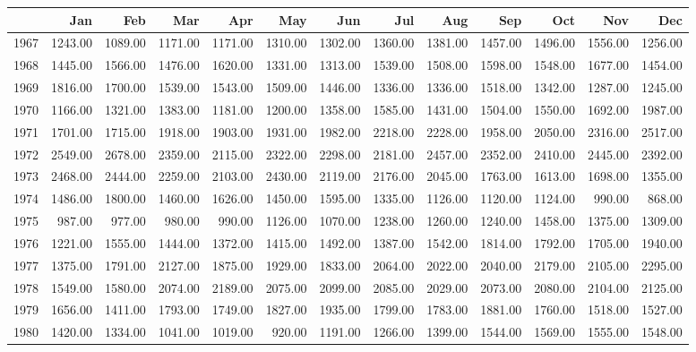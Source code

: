 \begin{longtable}{rrrrrrrrrrrrr}
  \hline
 & Jan & Feb & Mar & Apr & May & Jun & Jul & Aug & Sep & Oct & Nov & Dec \\ 
  \hline
1967 & 1243.00 & 1089.00 & 1171.00 & 1171.00 & 1310.00 & 1302.00 & 1360.00 & 1381.00 & 1457.00 & 1496.00 & 1556.00 & 1256.00 \\ 
  1968 & 1445.00 & 1566.00 & 1476.00 & 1620.00 & 1331.00 & 1313.00 & 1539.00 & 1508.00 & 1598.00 & 1548.00 & 1677.00 & 1454.00 \\ 
  1969 & 1816.00 & 1700.00 & 1539.00 & 1543.00 & 1509.00 & 1446.00 & 1336.00 & 1336.00 & 1518.00 & 1342.00 & 1287.00 & 1245.00 \\ 
  1970 & 1166.00 & 1321.00 & 1383.00 & 1181.00 & 1200.00 & 1358.00 & 1585.00 & 1431.00 & 1504.00 & 1550.00 & 1692.00 & 1987.00 \\ 
  1971 & 1701.00 & 1715.00 & 1918.00 & 1903.00 & 1931.00 & 1982.00 & 2218.00 & 2228.00 & 1958.00 & 2050.00 & 2316.00 & 2517.00 \\ 
  1972 & 2549.00 & 2678.00 & 2359.00 & 2115.00 & 2322.00 & 2298.00 & 2181.00 & 2457.00 & 2352.00 & 2410.00 & 2445.00 & 2392.00 \\ 
  1973 & 2468.00 & 2444.00 & 2259.00 & 2103.00 & 2430.00 & 2119.00 & 2176.00 & 2045.00 & 1763.00 & 1613.00 & 1698.00 & 1355.00 \\ 
  1974 & 1486.00 & 1800.00 & 1460.00 & 1626.00 & 1450.00 & 1595.00 & 1335.00 & 1126.00 & 1120.00 & 1124.00 & 990.00 & 868.00 \\ 
  1975 & 987.00 & 977.00 & 980.00 & 990.00 & 1126.00 & 1070.00 & 1238.00 & 1260.00 & 1240.00 & 1458.00 & 1375.00 & 1309.00 \\ 
  1976 & 1221.00 & 1555.00 & 1444.00 & 1372.00 & 1415.00 & 1492.00 & 1387.00 & 1542.00 & 1814.00 & 1792.00 & 1705.00 & 1940.00 \\ 
  1977 & 1375.00 & 1791.00 & 2127.00 & 1875.00 & 1929.00 & 1833.00 & 2064.00 & 2022.00 & 2040.00 & 2179.00 & 2105.00 & 2295.00 \\ 
  1978 & 1549.00 & 1580.00 & 2074.00 & 2189.00 & 2075.00 & 2099.00 & 2085.00 & 2029.00 & 2073.00 & 2080.00 & 2104.00 & 2125.00 \\ 
  1979 & 1656.00 & 1411.00 & 1793.00 & 1749.00 & 1827.00 & 1935.00 & 1799.00 & 1783.00 & 1881.00 & 1760.00 & 1518.00 & 1527.00 \\ 
  1980 & 1420.00 & 1334.00 & 1041.00 & 1019.00 & 920.00 & 1191.00 & 1266.00 & 1399.00 & 1544.00 & 1569.00 & 1555.00 & 1548.00 \\ 

\end{longtable}
